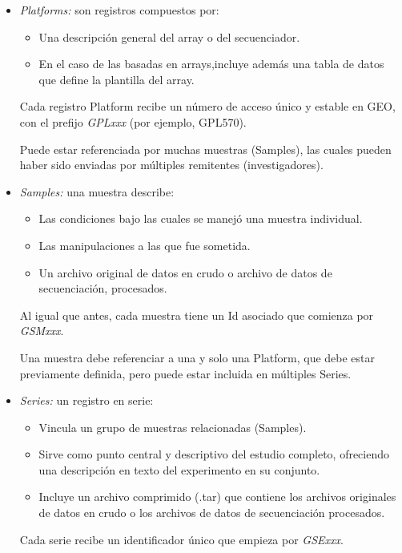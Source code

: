 \begin{itemize}
    \item \textit{Platforms: } son registros compuestos por:
    \begin{itemize}
        \item Una descripción general del array o del secuenciador.
        \item En el caso de las basadas en arrays,incluye además una tabla de datos que define la plantilla del array.
    \end{itemize} 

        Cada registro Platform recibe un número de acceso único y estable en GEO, con el prefijo \textit{GPLxxx} (por ejemplo, GPL570). \newline

        Puede estar referenciada por muchas muestras (Samples), las cuales pueden haber sido enviadas por múltiples remitentes (investigadores).

    \item \textit{Samples: } una muestra describe:
    \begin{itemize}
        \item Las condiciones bajo las cuales se manejó una muestra individual.
        \item Las manipulaciones a las que fue sometida.
        \item Un archivo original de datos en crudo o archivo de datos de secuenciación, procesados.
    \end{itemize}
    Al igual que antes, cada muestra tiene un Id asociado que comienza por \textit{GSMxxx}. \newline

    Una muestra debe referenciar a una y solo una Platform, que debe estar previamente definida, pero puede estar incluida en múltiples Series.
    
    \item \textit{Series: } un registro en serie:
    \begin{itemize}
        \item Vincula un grupo de muestras relacionadas (Samples).
        \item Sirve como punto central y descriptivo del estudio completo, ofreciendo una descripción en texto del experimento en su conjunto.
        \item Incluye un archivo comprimido (.tar) que contiene los archivos originales de datos en crudo o los archivos de datos de secuenciación
        procesados.
    \end{itemize}

    Cada serie recibe un identificador único que empieza por \textit{GSExxx}.
\end{itemize}

